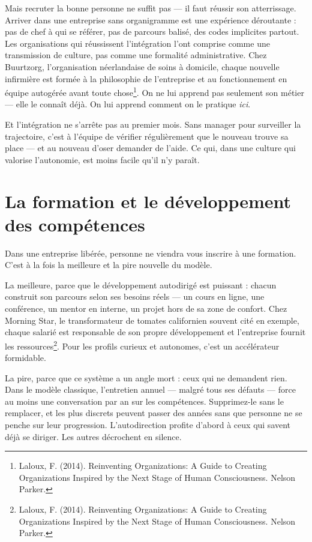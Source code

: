Mais recruter la bonne personne ne suffit pas — il faut réussir son atterrissage. Arriver dans une entreprise sans organigramme est une expérience déroutante : pas de chef à qui se référer, pas de parcours balisé, des codes implicites partout. Les organisations qui réussissent l'intégration l'ont comprise comme une transmission de culture, pas comme une formalité administrative. Chez Buurtzorg, l'organisation néerlandaise de soins à domicile, chaque nouvelle infirmière est formée à la philosophie de l'entreprise et au fonctionnement en équipe autogérée avant toute chose\footnote{Laloux, F. (2014). Reinventing Organizations: A Guide to Creating Organizations Inspired by the Next Stage of Human Consciousness. Nelson Parker.}. On ne lui apprend pas seulement son métier — elle le connaît déjà. On lui apprend comment on le pratique \emph{ici}.

Et l'intégration ne s'arrête pas au premier mois. Sans manager pour surveiller la trajectoire, c'est à l'équipe de vérifier régulièrement que le nouveau trouve sa place — et au nouveau d'oser demander de l'aide. Ce qui, dans une culture qui valorise l'autonomie, est moins facile qu'il n'y paraît.


\section{La formation et le développement des compétences}

Dans une entreprise libérée, personne ne viendra vous inscrire à une formation. C'est à la fois la meilleure et la pire nouvelle du modèle.

La meilleure, parce que le développement autodirigé est puissant : chacun construit son parcours selon ses besoins réels — un cours en ligne, une conférence, un mentor en interne, un projet hors de sa zone de confort. Chez Morning Star, le transformateur de tomates californien souvent cité en exemple, chaque salarié est responsable de son propre développement et l'entreprise fournit les ressources\footnote{Laloux, F. (2014). Reinventing Organizations: A Guide to Creating Organizations Inspired by the Next Stage of Human Consciousness. Nelson Parker.}. Pour les profils curieux et autonomes, c'est un accélérateur formidable.

La pire, parce que ce système a un angle mort : ceux qui ne demandent rien. Dans le modèle classique, l'entretien annuel — malgré tous ses défauts — force au moins une conversation par an sur les compétences. Supprimez-le sans le remplacer, et les plus discrets peuvent passer des années sans que personne ne se penche sur leur progression. L'autodirection profite d'abord à ceux qui savent déjà se diriger. Les autres décrochent en silence.

